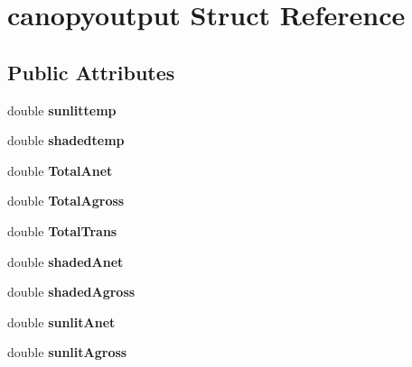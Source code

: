 \hypertarget{structcanopyoutput}{\section{canopyoutput Struct Reference}
\label{structcanopyoutput}
}
\subsection*{Public Attributes}
\begin{DoxyCompactItemize}
\item 
\hypertarget{structcanopyoutput_a5770498bb984033b0111aa900ddf6f44}{double {\bfseries sunlittemp}}\label{structcanopyoutput_a5770498bb984033b0111aa900ddf6f44}

\item 
\hypertarget{structcanopyoutput_a0477f9c1d4146fdd1baa333a36d257d8}{double {\bfseries shadedtemp}}\label{structcanopyoutput_a0477f9c1d4146fdd1baa333a36d257d8}

\item 
\hypertarget{structcanopyoutput_a97d026489be3eecef46d9a914272740c}{double {\bfseries Total\-Anet}}\label{structcanopyoutput_a97d026489be3eecef46d9a914272740c}

\item 
\hypertarget{structcanopyoutput_a061cad4a84af588b33815e32e54894b6}{double {\bfseries Total\-Agross}}\label{structcanopyoutput_a061cad4a84af588b33815e32e54894b6}

\item 
\hypertarget{structcanopyoutput_a00f3c0a8a11ae7b6309a5740e990be98}{double {\bfseries Total\-Trans}}\label{structcanopyoutput_a00f3c0a8a11ae7b6309a5740e990be98}

\item 
\hypertarget{structcanopyoutput_a00b7fcfd1a6b6484676d9f16a2fb351c}{double {\bfseries shaded\-Anet}}\label{structcanopyoutput_a00b7fcfd1a6b6484676d9f16a2fb351c}

\item 
\hypertarget{structcanopyoutput_ac6bfc1ba90db8aaf2045750516a53e5c}{double {\bfseries shaded\-Agross}}\label{structcanopyoutput_ac6bfc1ba90db8aaf2045750516a53e5c}

\item 
\hypertarget{structcanopyoutput_a588f71116e88b9b67389b7347066e9e9}{double {\bfseries sunlit\-Anet}}\label{structcanopyoutput_a588f71116e88b9b67389b7347066e9e9}

\item 
\hypertarget{structcanopyoutput_ad5d355a914a448494d6300b6b5cc996e}{double {\bfseries sunlit\-Agross}}\label{structcanopyoutput_ad5d355a914a448494d6300b6b5cc996e}


\end{DoxyCompactItemize}
